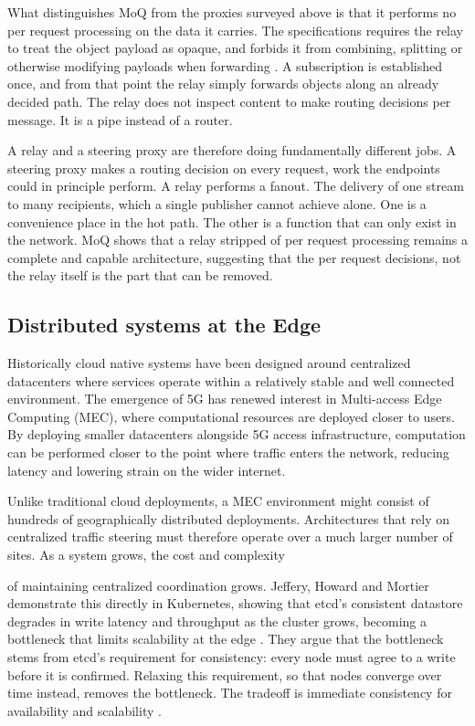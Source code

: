 \documentclass[a4paper,11pt]{article}
\begin{document}
What distinguishes MoQ from the proxies surveyed above is that it performs no per request
processing on the data it carries. The specifications requires the relay to treat the object payload as opaque,
and forbids it from combining, splitting or otherwise modifying payloads when forwarding \cite{nandakumarMediaQUICTransport2026}.
A subscription is established once, and from that point the relay simply forwards objects along an already decided path.
The relay does not inspect content to make routing decisions per message. It is a pipe instead of a router.

A relay and a steering proxy are therefore doing fundamentally different jobs.
A steering proxy makes a routing decision on every request, work the endpoints could in principle perform.
A relay performs a fanout. The delivery of one stream to many recipients,
which a single publisher cannot achieve alone. One is a convenience place in the hot path.
The other is a function that can only exist in the network. MoQ shows that a relay stripped of per
request processing remains a complete and capable architecture, suggesting that
the per request decisions, not the relay itself is the part that can be removed.


\subsection{Distributed systems at the Edge}

Historically cloud native systems have been designed around centralized datacenters where
services operate within a relatively stable and well connected environment. The emergence of 5G
has renewed interest in Multi-access Edge Computing (MEC), where computational resources are deployed
closer to users. By deploying smaller datacenters alongside 5G access infrastructure, computation
can be performed closer to the point where traffic enters the network, reducing latency and lowering
strain on the wider internet.

Unlike traditional cloud deployments, a MEC environment might consist of hundreds of
geographically distributed deployments. Architectures that rely on centralized traffic steering
must therefore operate over a much larger number of sites. As a system grows, the cost and complexity

of maintaining centralized coordination grows. Jeffery, Howard and Mortier demonstrate this
directly in Kubernetes, showing that etcd's consistent datastore degrades in write latency
and throughput as the cluster grows, becoming a bottleneck that limits scalability at the edge \cite{jefferyRearchitectingKubernetesEdge2021}.
They argue that the bottleneck stems from etcd's requirement for consistency: 
every node must agree to a write before it is confirmed. Relaxing this requirement, 
so that nodes converge over time instead, removes the bottleneck. 
The tradeoff is immediate consistency for availability and scalability \cite{jefferyRearchitectingKubernetesEdge2021}.
\end{document}
